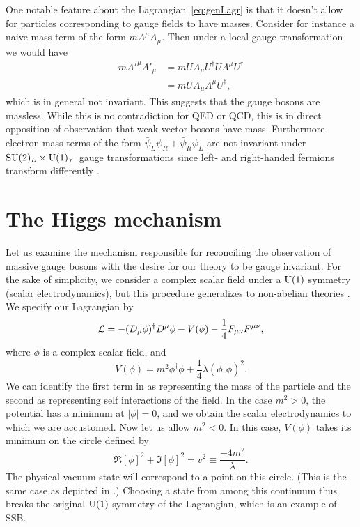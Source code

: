 One notable feature about the Lagrangian~\eqref{eq:genLagr} is that
it doesn't allow for particles corresponding to gauge fields to have masses.
Consider for instance a naive mass term of the form $mA^{\mu}A_{\mu}$. Then 
under a local gauge transformation we would have
\begin{equation}
  \begin{aligned}
  mA'^{\mu}A'_{\mu}&=mUA_{\mu}U^{\dagger}UA^{\mu}U^{\dagger} \\
                   &=mUA_{\mu}A^{\mu}U^{\dagger},
  \end{aligned}
\end{equation}
which is in general not invariant. This suggests that the gauge bosons are
massless. While this is no contradiction for QED or QCD, this is in direct
opposition of observation that weak vector bosons have mass. Furthermore
electron mass terms of the form $\bar{\psi}_{L}\psi_{R}+
\bar{\psi}_{R}\psi_{L}$ are not invariant under 
$\operatorname{SU}(2)_{L}\times \operatorname{U}(1)_{Y}$ gauge transformations since left- and 
right-handed fermions
transform differently \cite{dittmaier_higgs_2013}.

\section{The Higgs mechanism}

Let us examine the mechanism responsible for reconciling the observation of 
massive gauge bosons with the desire for our theory to be gauge invariant. For 
the sake of simplicity, we consider a complex scalar field under a $\operatorname{U}(1)$ 
symmetry (scalar electrodynamics), but this procedure generalizes to 
non-abelian theories \cite{srednicki_quantum_2007}. 
We specify our Lagrangian by 
\begin{equation}
  \label{eq:HLagr1}
  \mathcal{L}=-(D_{\mu}\phi)^{\dagger}D^{\mu}\phi-V(\phi)
              -\frac{1}{4}F_{\mu\nu}F^{\mu\nu},
\end{equation}
where $\phi$ is a complex scalar field, and
\begin{equation}
  \label{eq:pot}
  V(\phi)=m^{2}\phi^{\dagger}\phi+\frac{1}{4}\lambda(\phi^{\dagger}\phi)^{2}.
\end{equation}
We can identify the first term in  as representing the mass of
the particle and the second as representing self interactions of the field.
In the case $m^2>0$, the potential has a minimum at $|\phi|=0$, and we obtain 
the scalar electrodynamics to which we are accustomed. Now let us allow 
$m^2<0$. In this case, $V(\phi)$ takes its minimum on the circle defined by
\begin{equation}
  \label{eq:v2}
  \Re[\phi]^2+\Im[\phi]^2=v^2\equiv\frac{-4m^2}{\lambda}.
\end{equation}
The physical vacuum state will correspond to a point on this circle. (This
is the same case as depicted in .) Choosing a state 
from among this continuum thus breaks the original
$\operatorname{U}(1)$ symmetry of the Lagrangian, which is an example of SSB. 

